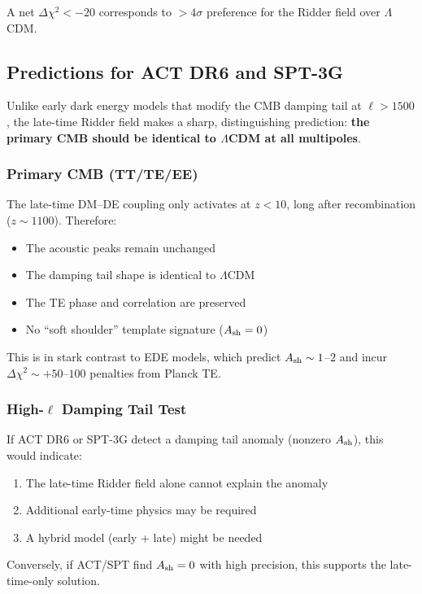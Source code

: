 \documentclass[twocolumn,showpacs,preprintnumbers,amsmath,amssymb,prd]{revtex4-2}
\begin{document}
A net $\Delta\chi^2 < -20$ corresponds to $>4\sigma$ preference for the Ridder field over $\Lambda$CDM.

\subsection{Predictions for ACT DR6 and SPT-3G}

Unlike early dark energy models that modify the CMB damping tail at $\ell > 1500$, the late-time Ridder field makes a sharp, distinguishing prediction: \textbf{the primary CMB should be identical to $\Lambda$CDM at all multipoles}.

\subsubsection{Primary CMB (TT/TE/EE)}

The late-time DM--DE coupling only activates at $z < 10$, long after recombination ($z \sim 1100$). Therefore:
\begin{itemize}
    \item The acoustic peaks remain unchanged
    \item The damping tail shape is identical to $\Lambda$CDM
    \item The TE phase and correlation are preserved
    \item No ``soft shoulder'' template signature ($A_{\rm sh} = 0$)
\end{itemize}

This is in stark contrast to EDE models, which predict $A_{\rm sh} \sim 1$--$2$ and incur $\Delta\chi^2 \sim +50$--$100$ penalties from Planck TE.

\subsubsection{High-$\ell$ Damping Tail Test}

If ACT DR6 or SPT-3G detect a damping tail anomaly (nonzero $A_{\rm sh}$), this would indicate:
\begin{enumerate}
    \item The late-time Ridder field alone cannot explain the anomaly
    \item Additional early-time physics may be required
    \item A hybrid model (early + late) might be needed
\end{enumerate}

Conversely, if ACT/SPT find $A_{\rm sh} = 0$ with high precision, this supports the late-time-only solution.
\end{document}

